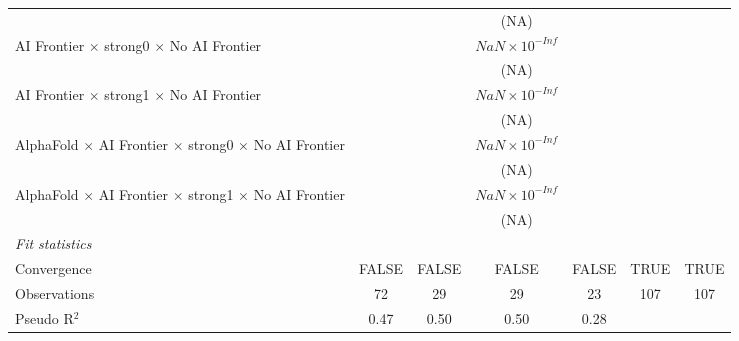 \begin{tabular}{lcccccc}
                                                                              &                        &                        & (NA)                    &                         &      &   \\   
   AI Frontier $\times$ strong0 $\times$ No AI Frontier                       &                        &                        & $NaN\times 10^{-Inf}$   &                         &      &   \\   
                                                                              &                        &                        & (NA)                    &                         &      &   \\   
   AI Frontier $\times$ strong1 $\times$ No AI Frontier                       &                        &                        & $NaN\times 10^{-Inf}$   &                         &      &   \\   
                                                                              &                        &                        & (NA)                    &                         &      &   \\   
   AlphaFold $\times$ AI Frontier $\times$ strong0 $\times$ No AI Frontier    &                        &                        & $NaN\times 10^{-Inf}$   &                         &      &   \\   
                                                                              &                        &                        & (NA)                    &                         &      &   \\   
   AlphaFold $\times$ AI Frontier $\times$ strong1 $\times$ No AI Frontier    &                        &                        & $NaN\times 10^{-Inf}$   &                         &      &   \\   
                                                                              &                        &                        & (NA)                    &                         &      &   \\   
   \midrule
   \emph{Fit statistics}\\
   Convergence                                                                &FALSE                   & FALSE                  & FALSE                   & FALSE                   & TRUE & TRUE\\  
   Observations                                                               & 72                     & 29                     & 29                      & 23                      & 107  & 107\\  
   Pseudo R$^2$                                                               & 0.47                   & 0.50                   & 0.50                    & 0.28                    &      & \\  
   

\end{tabular}
